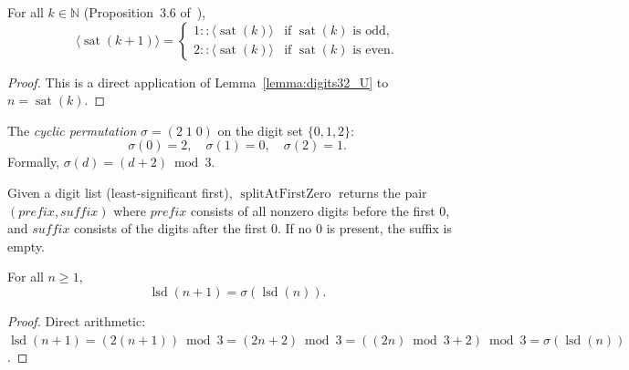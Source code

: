 \begin{lemma}\label{lemma:sat_digits_prefix}\leanok
For all $k \in \mathbb{N}$ (Proposition~3.6 of~\cite{eli25}),
\[
  \langle \operatorname{sat}(k+1) \rangle =
  \begin{cases}
    1 :: \langle \operatorname{sat}(k) \rangle & \text{if } \operatorname{sat}(k) \text{ is odd}, \\
    2 :: \langle \operatorname{sat}(k) \rangle & \text{if } \operatorname{sat}(k) \text{ is even}.
  \end{cases}
\]
\end{lemma}
\begin{proof}\leanok
This is a direct application of Lemma~\ref{lemma:digits32_U} to
$n = \operatorname{sat}(k)$.
\end{proof}


\begin{definition}\label{def:sigma}\leanok
The \emph{cyclic permutation} $\sigma = (2\;1\;0)$ on the digit set $\{0,1,2\}$:
\[
  \sigma(0) = 2, \quad \sigma(1) = 0, \quad \sigma(2) = 1.
\]
Formally, $\sigma(d) = (d + 2) \bmod 3$.
\end{definition}

\begin{definition}\label{def:splitAtFirstZero}\leanok
Given a digit list (least-significant first),
$\operatorname{splitAtFirstZero}$ returns the pair
$(\mathit{prefix}, \mathit{suffix})$ where $\mathit{prefix}$ consists of
all nonzero digits before the first $0$, and $\mathit{suffix}$ consists
of the digits after the first $0$.  If no $0$ is present, the suffix is
empty.
\end{definition}

\begin{lemma}\label{lemma:lsd_succ}\leanok
For all $n \ge 1$,
\[
  \operatorname{lsd}(n+1) = \sigma(\operatorname{lsd}(n)).
\]
\end{lemma}
\begin{proof}\leanok
Direct arithmetic: $\operatorname{lsd}(n+1) = (2(n+1)) \bmod 3 = (2n + 2) \bmod 3 = ((2n) \bmod 3 + 2) \bmod 3 = \sigma(\operatorname{lsd}(n))$.
\end{proof}

